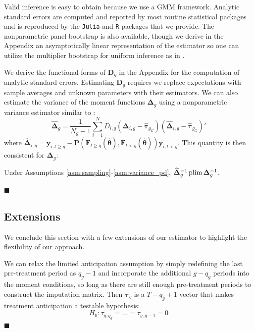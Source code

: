 \documentclass[12pt]{article}
\begin{document}
\begin{remark}[Inference]\label{remark:uniform}
    Valid inference is easy to obtain because we use a GMM framework. Analytic standard errors are computed and reported by most routine statistical packages and is reproduced by the \texttt{Julia} and \texttt{R} packages that we provide. The nonparametric panel bootstrap is also available, though we derive in the Appendix an asymptotically linear representation of the estimator so one can utilize the multiplier bootstrap for uniform inference as in \citet{Callaway_Karami_2020}. 

    We derive the functional forms of $\bm D_g$ in the Appendix for the computation of analytic standard errors. Estimating $\bm D_g$ requires we replace expectations with sample averages and unknown parameters with their estimators. We can also estimate the variance of the moment functions $\bm \Delta_g$ using a nonparametric variance estimator similar to \citet{pesaran2006estimation}:   \begin{equation}\label{eq:nonparametric_variance}
        \widehat{\bm \Delta}_g = \frac{1}{N_g - 1} \sum_{i = 1}^N D_{i,g} \left( \widehat{\bm \Delta}_{i,g} - \widehat{\bm \tau}_{g_G} \right) \left( \widehat{\bm \Delta}_{i,g} - \widehat{\bm \tau}_{g_G} \right)'
    \end{equation}
    where $\widehat{\bm \Delta}_{i,g} = \bm y_{i, t \geq g} - \bm P(\bm{F}_{t \geq g}(\widehat{\bm{\theta}}), \bm{F}_{t < g}(\widehat{\bm{\theta}})) \bm y_{i, t < g}$. This quantity is then consistent for $\bm \Delta_g$: 
    \begin{theorem}\label{theorem:nonparametric_variance}
  Under Assumptions \ref{asm:sampling}-\ref{asm:variance_pd}, $\widehat{\bm \Delta}_g^{-1} \operatorname{plim} \bm \Delta_g^{-1}$.
\end{theorem}
\noindent $\blacksquare$
\end{remark}

\subsection{Extensions}

We conclude this section with a few extensions of our estimator to highlight the flexibility of our approach.

\begin{remark}
We can relax the limited anticipation assumption by simply redefining the last pre-treatment period as $q_g - 1$ and incorporate the additional $g - q_g$ periods into the moment conditions, so long as there are still enough pre-treatment periods to construct the imputation matrix. Then $\bm \tau_g$ is a $T - q_g + 1$ vector that makes treatment anticipation a testable hypothesis:
\begin{equation}
H_0: \tau_{g,q_g} = ... = \tau_{g,g-1} = 0 
\end{equation}
$\blacksquare$
\end{remark} 
\end{document}
